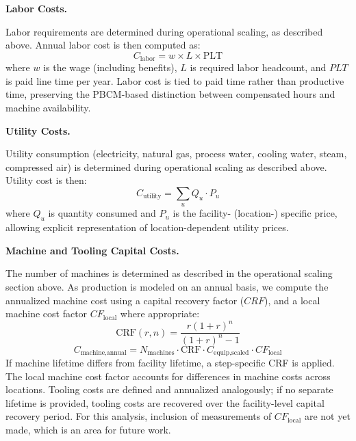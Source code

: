 \medskip
\noindent\textbf{Labor Costs.}\quad

Labor requirements are determined during operational scaling, as described above. Annual labor cost is then computed as:
\begin{equation}
    C_{\text{labor}} = w \times L \times \text{PLT}
\end{equation}
where $w$ is the wage (including benefits), $L$ is required labor headcount, and $PLT$ is paid line time per year. Labor cost is tied to paid time rather than productive time, preserving the PBCM-based distinction between compensated hours and machine availability.

\medskip
\noindent\textbf{Utility Costs.}\quad

Utility consumption (electricity, natural gas, process water, cooling water, steam, compressed air) is determined during operational scaling as described above. Utility cost is then:
\begin{equation}
    C_{\text{utility}} = \sum_{u} Q_u \cdot P_u
\end{equation}
where $Q_u$ is quantity consumed and $P_u$ is the facility- (location-) specific price, allowing explicit representation of location-dependent utility prices.

\medskip
\noindent\textbf{Machine and Tooling Capital Costs.}\quad

The number of machines is determined as described in the operational scaling section above. As production is modeled on an annual basis, we compute the annualized machine cost using a capital recovery factor ($CRF$), and a local machine cost factor $CF_{\text{local}}$ where appropriate:
\begin{equation}
    \text{CRF}(r, n) = \frac{r(1+r)^n}{(1+r)^n - 1}
    \label{eq:c-crf}
\end{equation}
\alteqend
\begin{equation}
    C_{\text{machine,annual}} = N_\text{{machines}} \cdot \text{CRF} \cdot C_{\text{equip,scaled}} \cdot CF_{\text{local}}
\end{equation}
If machine lifetime differs from facility lifetime, a step-specific CRF is applied. The local machine cost factor accounts for differences in machine costs across locations. Tooling costs are defined and annualized analogously; if no separate lifetime is provided, tooling costs are recovered over the facility-level capital recovery period. For this analysis, inclusion of measurements of $CF_{\text{local}}$ are not yet made, which is an area for future work.

